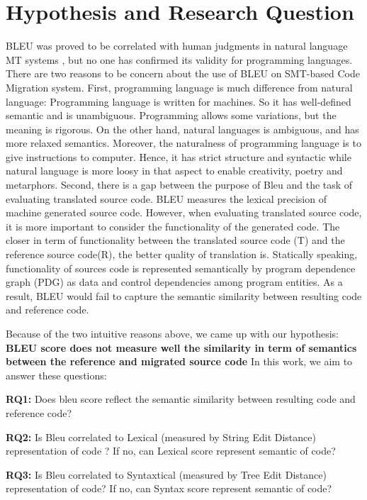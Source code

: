 \section{Hypothesis and Research Question}
BLEU was proved to be correlated with human judgments in natural language MT systems \cite {Papineni02}, but no one has confirmed its validity for programming languages. There are two reasons to be concern about the use of BLEU on SMT-based Code Migration system. First, programming language is much difference from natural language: Programming language is written for machines. So it has well-defined semantic and is unambiguous. Programming allows some variations, but the meaning is rigorous. On the other hand, natural languages is ambiguous, and has more relaxed semantics. Moreover, the naturalness of programming language is to give instructions to computer. Hence, it has strict structure and syntactic while natural language is more loosy in that aspect to enable creativity, poetry and metarphors. Second, there is a gap between the purpose of Bleu and the task of evaluating translated source code. BLEU measures the lexical precision of machine generated source code. However, when evaluating translated source code, it is more important to consider the functionality of the generated code. The closer in term of functionality between the translated source code (T) and the reference source code(R), the better quality of translation is. Statically speaking, functionality of sources code is represented semantically by program dependence
graph (PDG) as data and control dependencies among program entities. As a result, BLEU would fail to capture the semantic similarity between resulting code and reference code.

Because of the two intuitive reasons above, we came up with our hypothesis: 
\textbf{ BLEU score does not measure well the similarity in term of semantics between the reference and migrated source code }
In this work, we aim to answer these questions:

\textbf{RQ1: }
Does bleu score reflect the semantic similarity between resulting code and reference code?

\textbf{RQ2: } 
Is Bleu correlated to Lexical (measured by String Edit Distance) representation of code ? If no, can Lexical score represent semantic of code?

\textbf{RQ3: } 
Is Bleu correlated to Syntaxtical (measured by Tree Edit Distance)  representation of code? If no, can Syntax score represent semantic of code?

